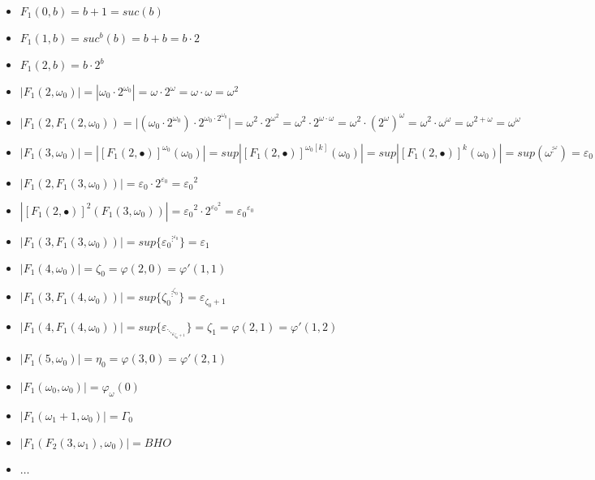 \documentclass[10pt]{article}
\begin{document}
\begin{itemize}
     \setlength{\itemsep}{1pt}
     \setlength{\parskip}{0pt}
     \setlength{\parsep}{0pt}
\item \( F_1(0,b) = b+1 = suc(b) \)
\item \( F_1(1,b) = suc^b(b) = b+b = b \cdot 2\)
\item \( F_1(2,b) = b \cdot 2^b \)
\item \( |F_1(2,\omega_0)| = |\omega_0 \cdot 2^{\omega_0}| = \omega \cdot 2^\omega = \omega \cdot \omega = \omega^2 \)
\item \( |F_1(2,F_1(2,\omega_0)) = |(\omega_0 \cdot 2^{\omega_0}) \cdot 2^{\omega_0 \cdot 2^{\omega_0}}| = \omega^2 \cdot 2^{\omega^2} = \omega^2 \cdot 2^{\omega \cdot \omega} = \omega^2 \cdot (2^\omega)^\omega = \omega^2 \cdot \omega^\omega = \omega^{2+\omega} = \omega^\omega \) 
\item \( |F_1(3,\omega_0)| = |[F_1(2,\bullet)]^{\omega_0}(\omega_0)| = sup |[F_1(2,\bullet)]^{\omega_0[k]}(\omega_0)| = sup |[F_1(2,\bullet)]^k(\omega_0)| = sup (\omega^{\vdots^\omega}) = \varepsilon_0 \)
\item \( |F_1(2,F_1(3,\omega_0))| = \varepsilon_0 \cdot 2^{\varepsilon_0} = {\varepsilon_0}^2 \)
\item \( |[F_1(2,\bullet)]^2(F_1(3,\omega_0))| = {\varepsilon_0}^2 \cdot 2^{{\varepsilon_0}^2} = {\varepsilon_0}^{\varepsilon_0} \)
\item \( |F_1(3,F_1(3,\omega_0))| = sup \lbrace {\varepsilon_0}^{\vdots^{\varepsilon_0}} \rbrace = \varepsilon_1 \)
\item \( |F_1(4,\omega_0)| = \zeta_0 = \varphi(2,0) = \varphi'(1,1) \)
\item \( |F_1(3,F_1(4,\omega_0))| = sup \lbrace {\zeta_0}^{\vdots^{\zeta_0}} \rbrace = \varepsilon_{\zeta_0+1} \)
\item \( |F_1(4,F_1(4,\omega_0))| = sup \lbrace \varepsilon_{\ddots_{\varepsilon_{\zeta_0+1}}} \rbrace = \zeta_1 = \varphi(2,1) = \varphi'(1,2) \)
\item \( |F_1(5,\omega_0)| = \eta_0 = \varphi(3,0) = \varphi'(2,1) \)
\item \( |F_1(\omega_0,\omega_0)| = \varphi_\omega(0) \)
\item \( |F_1(\omega_1+1,\omega_0)| = \Gamma_0 \)
\item \( |F_1(F_2(3,\omega_1),\omega_0)| = BHO \)

\item \( \ldots \)
\end{itemize}
\end{document}
